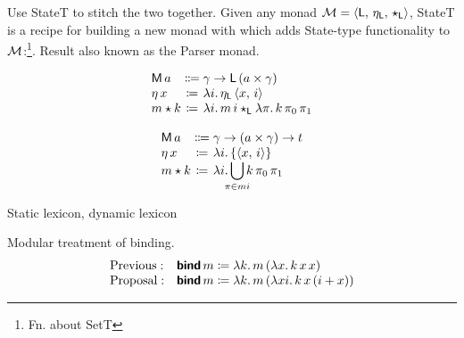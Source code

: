 	Use StateT to stitch the two together. Given any monad ${\cal M}= \langle \textsf{L},\,\eta_\textsf{L},\,\star_\textsf{L} \rangle$, StateT is a recipe for building a new monad with which adds State-type functionality to ${\cal M}$:\footnote{Fn. about SetT}. Result also known as the Parser monad. \citealt{HuttonMeijer}%
	\begin{defi}\label{statet}
		\[\begin{array}[t]
			{@{}l@{}c@{}l@{}}
			\textsf{M}\,a &{}\Coloneqq{} &\gamma \ra \textsf{L}\,(a \times \gamma)%
			\\
			\eta\,x &{}\ceq{} &\lambda i .\,\eta_\textsf{L}\,\ab{x,\,i}
			\\
			m \star k &{}\ceq{} &\lambda i.\, m\,i\star_\textsf{L} \lambda \pi.\,k\,\pi_0\,\pi_1%
		\end{array}\]
	\end{defi}
	\begin{defi}\label{stateset}
		\[\begin{array}[t]
			{@{}l@{}c@{}l@{}}
			\textsf{M}\,a &{}\Coloneqq{} &\gamma \ra (a \times \gamma) \ra t%
			\\
			\eta\,x &{}\ceq{} &\lambda i.\left\{\ab{x,\,i}\right\}
			\\
			m \star k &{}\ceq{} &\lambda i.\displaystyle\bigcup_{\mathclap{\pi \in mi}}k\,\pi_0\,\pi_1%
		\end{array}\]
	\end{defi}

	Static lexicon, dynamic lexicon
	
	Modular treatment of binding.%
	\[\begin{array}{ll}
		\text{Previous}:& \bsf{bind}\,m \ceq \lambda k.\,m\,(\lambda x.\,k\,x\,x)%
		\\
		\text{Proposal}:& \bsf{bind}\,m \ceq \lambda k.\,m\,(\lambda xi.\,k\,x\,(i + x))%
	\end{array}\]

